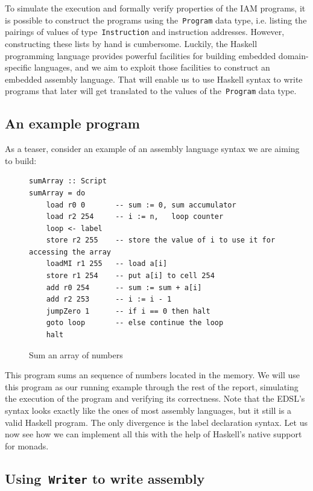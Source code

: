 To simulate the execution and formally verify properties of the IAM programs,
it is possible to construct the programs using the~\texttt{Program} data type, i.e.
listing the pairings of values of type~\texttt{Instruction} and instruction addresses.
However, constructing these lists by hand is cumbersome. Luckily, the Haskell programming
language provides powerful facilities for building embedded domain-specific languages, and
we aim to exploit those facilities to construct an embedded assembly language.
That will enable us to use Haskell syntax to write programs that later will get translated
to the values of the~\texttt{Program} data type.

\subsection{An example program}

As a teaser, consider an example of an assembly language syntax we are aiming to build:

\begin{figure}[H]
\begin{verbatim}
sumArray :: Script
sumArray = do
    load r0 0       -- sum := 0, sum accumulator
    load r2 254     -- i := n,   loop counter
    loop <- label
    store r2 255    -- store the value of i to use it for accessing the array
    loadMI r1 255   -- load a[i]
    store r1 254    -- put a[i] to cell 254
    add r0 254      -- sum := sum + a[i]
    add r2 253      -- i := i - 1
    jumpZero 1      -- if i == 0 then halt
    goto loop       -- else continue the loop
    halt
\end{verbatim}
\caption{Sum an array of numbers}
\label{syntaxExample}
\end{figure}

This program sums an sequence of numbers located in the memory. We will use this program as
our running example through the rest of the report, simulating the execution of the program
and verifying its correctness. Note that the EDSL's syntax looks exactly like the ones of most
assembly languages, but it still is a valid Haskell program. The only
divergence is the label declaration syntax. Let us now see how we can implement
all this with the help of Haskell's native support for monads.

\subsection{Using~\texttt{Writer} to write assembly}

